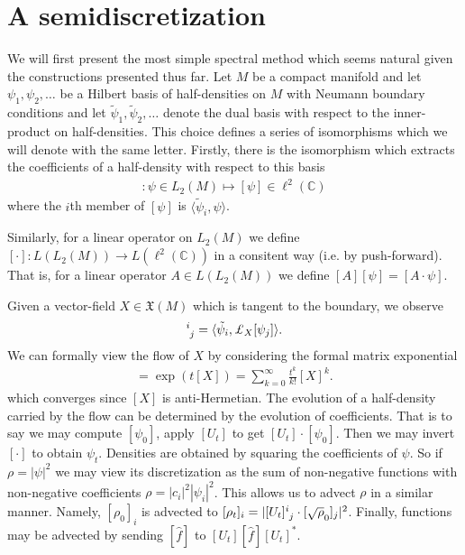 \documentclass[12pt]{amsart}
\begin{document}
\section{A semidiscretization}
\label{sec:semi_discretization}

We will first present the most simple spectral method
which seems natural given the constructions presented thus far.
Let $M$ be a compact manifold and let
$\psi_1,\psi_2,\dots$ be a Hilbert basis of half-densities
on $M$ with Neumann boundary conditions
and let $\tilde{\psi}_1,\tilde{\psi}_2,\dots$ denote the dual basis
with respect to the inner-product on half-densities.
This choice defines a series of isomorphisms which we will
denote with the same letter.
Firstly, there is the isomorphism which extracts the coefficients of 
a half-density with respect to this basis
\begin{align*}
  [\cdot ] : \psi \in L_2(M) \mapsto [\psi] \in \ell^2( \mathbb{C})
\end{align*}
where the $i$th member of $[\psi]$ is $\langle \tilde{\psi}_i , \psi \rangle$.

Similarly, for a linear operator on $L_2(M)$ we define $[\cdot ]: L( L_2(M)) \to L( \ell^2( \mathbb{C}) )$ in a consitent way (i.e. by push-forward).  That is, for a linear operator $A \in L( L_2 (M))$ we define $[A] [\psi] = [A \cdot \psi]$. 

Given a vector-field $X \in \mathfrak{X}(M)$ which is tangent to the
boundary, we observe
\begin{align*}
  [X]\indices{^i_j} = \langle \tilde{\psi}_i , \pounds_X[ \psi_j ] \rangle.
\end{align*}
We can formally view the flow of $X$ by considering the formal
matrix exponential
\begin{align*}
  [U_t] = \exp( t[X] ) = \sum_{k=0}^{\infty} \frac{t^k}{k!} [X]^k.
\end{align*}
which converges since $[X]$ is anti-Hermetian.
The evolution of a half-density carried by the flow can be determined by the evolution of coefficients.
That is to say we may compute $[\psi_0]$, apply $[U_t]$ to get $[U_t] \cdot [\psi_0]$.
Then we may invert $[\cdot]$ to obtain $\psi_t$.
Densities are obtained by squaring the coefficients of $\psi$.
So if $\rho = |\psi|^2$ we may view its discretization as the sum of non-negative functions with non-negative coefficients $\rho = |c_i|^2 |\psi_i|^2$.
This allows us to advect $\rho$ in a similar manner.
Namely, $[\rho_0]_i$ is advected to $[\rho_t]_i = | [U_t]\indices{^i_j} \cdot [\sqrt{\rho}_0]_j |^2$.
Finally, functions may be advected by sending $[\hat{f}]$ to $[U_t] [\hat{f}] [U_t]^*$.
\end{document}
